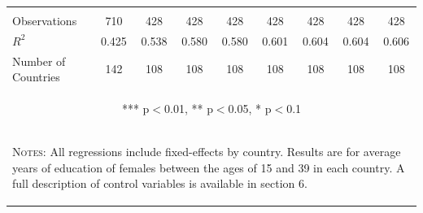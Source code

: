 \documentclass[10pt,letterpaper,subeqn, xcolor=table]{beamer}
\begin{document}
\begin{frame}[label=otherPANEL]
\begin{table}[htpb!]
\begin{center}
{\begin{tabular}{lcccccccc}
        \vspace{4pt} & \begin{footnotesize}\end{footnotesize} & \begin{footnotesize}\end{footnotesize} & \begin{footnotesize}\end{footnotesize} & \begin{footnotesize}\end{footnotesize} & \begin{footnotesize}\end{footnotesize} & \begin{footnotesize}\end{footnotesize} & \begin{footnotesize}\end{footnotesize} & \begin{footnotesize}\end{footnotesize} \\

        Observations&710&428&428&428&428&428&428&428\\

        $R^2$&0.425&0.538&0.580&0.580&0.601&0.604&0.604&0.606\\

        Number of Countries&142&108&108&108&108&108&108&108\\ \midrule

        \multicolumn{9}{c}{\begin{footnotesize} *** p$<$0.01, ** p$<$0.05, * p$<$0.1\end{footnotesize}} \\
        \multicolumn{9}{p{19cm}}{\begin{footnotesize}\textsc{Notes:} All regressions include fixed-effects by country.  Results are for average years of education of females between the ages of 15 and 39 in each country.  A full description of control variables is available in section 6. \end{footnotesize}} \\
        \bottomrule
      \end{tabular}
      }
    \end{center}
  \end{table}
\hyperlink{PTABLE}{}
\end{frame}
\end{document}
